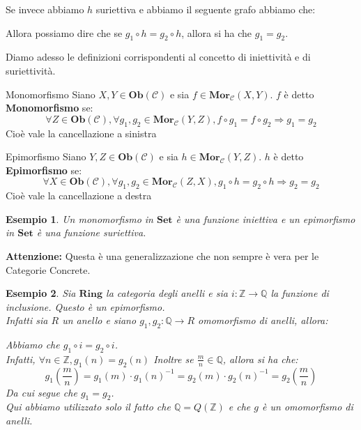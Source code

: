 \documentclass[11pt,a4paper,twoside]{article}
\newtheorem{es}{Esempio}
\theoremstyle{definition}
\begin{document}
Se invece abbiamo $h$ suriettiva e abbiamo il seguente grafo abbiamo che:
\begin{center}
\end{center}
Allora possiamo dire che se $g_1 \circ h = g_2 \circ h$, allora si ha che $g_1 = g_2$.

Diamo adesso le definizioni corrispondenti al concetto di iniettività e di suriettività.

\begin{defn}{Monomorfismo}{}
	Siano $X, Y \in \bm{Ob}(\mathcal C)$ e sia $f \in \bm{Mor}_\mathcal C(X, Y)$. $f$ è detto \textbf{Monomorfismo} se:
	\[\forall Z \in \bm{Ob}(\mathcal C), \forall g_1, g_2 \in \bm{Mor}_\mathcal C(Y, Z), f\circ g_1 = f \circ g_2 \Rightarrow g_1 = g_2\]
	Cioè vale la cancellazione a sinistra
\end{defn}

\begin{defn}{Epimorfismo}{}
	Siano $Y, Z \in \bm{Ob}(\mathcal C)$ e sia $h \in \bm{Mor}_\mathcal C (Y,Z)$. $h$ è detto \textbf{Epimorfismo} se:
	\[\forall X \in \bm{Ob}(\mathcal C), \forall g_1, g_2 \in \bm{Mor}_\mathcal C(Z, X), g_1 \circ h = g_2 \circ h \Rightarrow g_2 = g_2 \]
	Cioè vale la cancellazione a destra
\end{defn}

\begin{es}
	Un monomorfismo in $\bm{Set}$ è una funzione iniettiva e un epimorfismo in $\bm{Set}$ è una funzione suriettiva.
\end{es}

\textbf{Attenzione:} Questa è una generalizzazione che non sempre è vera per le Categorie Concrete.

\begin{es}
	Sia $\bm{Ring}$ la categoria degli anelli e sia $i \colon \mathbb Z \to \mathbb Q$ la funzione di inclusione.
	Questo è un epimorfismo.\\
	Infatti sia $R$ un anello e siano $g_1,g_2 \colon \mathbb Q \to R$ omomorfismo di anelli, allora:
	\begin{center}
	\end{center}
	Abbiamo che $g_1 \circ i = g_2 \circ i$.\\
	Infatti, $\forall n \in \mathbb Z, g_1(n) = g_2(n)$
	Inoltre se $\frac mn \in \mathbb Q$, allora si ha che:
	\[ g_1 \left( \frac mn \right) = g_1(m)\cdot g_1(n)^{-1} = g_2(m) \cdot g_2(n)^{-1} = g_2 \left( \frac mn \right) \]
	Da cui segue che $g_1 = g_2$.\\
	Qui abbiamo utilizzato solo il fatto che $\mathbb Q = Q(\mathbb Z)$ e che $g$ è un omomorfismo di anelli.
\end{es}
\end{document}
